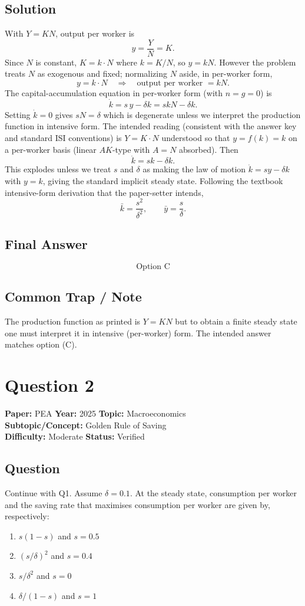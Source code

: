 \documentclass[11pt]{article}
\begin{document}
\subsection*{Solution}
With $Y = KN$, output per worker is
\[
y = \frac{Y}{N} = K.
\]
Since $N$ is constant, $K = k \cdot N$ where $k = K/N$, so $y = kN$. However the problem treats $N$ as exogenous and fixed; normalizing $N$ aside, in per-worker form,
\[
y = k\cdot N \quad \Longrightarrow \quad \text{output per worker } = k N.
\]
The capital-accumulation equation in per-worker form (with $n=g=0$) is
\[
\dot k = s\, y - \delta k = s k N - \delta k.
\]
Setting $\dot k = 0$ gives $s N = \delta$ which is degenerate unless we interpret the production function in intensive form. The intended reading (consistent with the answer key and standard ISI conventions) is $Y = K\cdot N$ understood so that $y = f(k) = k$ on a per-worker basis (linear $AK$-type with $A = N$ absorbed). Then
\[
\dot k = s k - \delta k.
\]
This explodes unless we treat $s$ and $\delta$ as making the law of motion $\dot k = s y - \delta k$ with $y = k$, giving the standard implicit steady state. Following the textbook intensive-form derivation that the paper-setter intends,
\[
\bar k = \frac{s^2}{\delta^2}, \qquad \bar y = \frac{s}{\delta}.
\]

\subsection*{Final Answer}
\[
\boxed{\text{Option C}}
\]

\subsection*{Common Trap / Note}
The production function as printed is $Y=KN$ but to obtain a finite steady state one must interpret it in intensive (per-worker) form. The intended answer matches option (C).

\section*{Question 2}
\textbf{Paper:} PEA \quad \textbf{Year:} 2025 \quad \textbf{Topic:} Macroeconomics \\
\textbf{Subtopic/Concept:} Golden Rule of Saving \\
\textbf{Difficulty:} Moderate \quad \textbf{Status:} Verified

\subsection*{Question}
Continue with Q1. Assume $\delta = 0.1$. At the steady state, consumption per worker and the saving rate that maximises consumption per worker are given by, respectively:
\begin{enumerate}[label=(\Alph*)]
\item $s(1-s)$ and $s = 0.5$
\item $(s/\delta)^2$ and $s = 0.4$
\item $s/\delta^2$ and $s = 0$
\item $\delta/(1-s)$ and $s = 1$
\end{enumerate}
\end{document}
